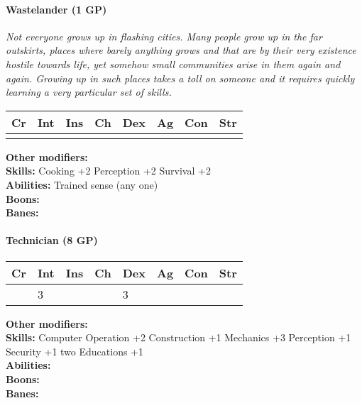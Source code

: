 \documentclass[12pt,a4paper,openany]{book}
\begin{document}
	\paragraph*{Wastelander (1 GP)}
	\textit{Not everyone grows up in flashing cities. Many people grow up in the far outskirts, places where barely anything grows and that are by their very existence hostile towards life, yet somehow small communities arise in them again and again. 
		Growing up in such places takes a toll on someone and it requires quickly learning a very particular set of skills.}\par
	\begin{tabular}{|l|l|l|l|l|l|l|l|}
		\hline
		Cr & Int & Ins & Ch & Dex & Ag & Con & Str \\ \hline
		&  &  &  &  &  &  &  \\ \hline
	\end{tabular}\par
	\noindent\textbf{Other modifiers:} \\
	\textbf{Skills:} Cooking +2
	Perception +2
	Survival +2\\
	\textbf{Abilities:} Trained sense (any one)\\
	\textbf{Boons:} \\
	\textbf{Banes:} \\
	
	\hrulefill
	\paragraph*{Technician (8 GP)}
	\textit{}\par
	\begin{tabular}{|l|l|l|l|l|l|l|l|}
		\hline
		Cr & Int & Ins & Ch & Dex & Ag & Con & Str \\ \hline
		& 3 &  &  & 3 &  &  &  \\ \hline
	\end{tabular}\par
	\noindent\textbf{Other modifiers:} \\
	\textbf{Skills:} Computer Operation +2
	Construction +1
	Mechanics +3
	Perception +1
	Security +1
	two Educations +1\\
	\textbf{Abilities:} \\
	\textbf{Boons:} \\
	\textbf{Banes:} \\
	
	\hrulefill
\end{document}
